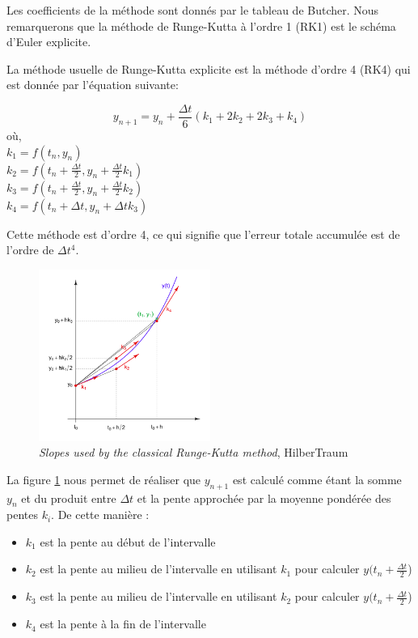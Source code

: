 Les coefficients de la méthode sont donnés par le tableau de Butcher. Nous remarquerons que la méthode de Runge-Kutta à l'ordre 1 (RK1) est le schéma d'Euler explicite.

La méthode usuelle de Runge-Kutta explicite est la méthode d'ordre 4 (RK4) qui est donnée par l'équation suivante:

\begin{equation}
    y_{n+1} = y_n + \frac{\Delta t}{6}(k_1 + 2k_2 + 2k_3 + k_4)
\end{equation}
où,\\
$k_1 = f(t_n, y_n)$\\
$k_2 = f(t_n + \frac{\Delta t}{2}, y_n + \frac{\Delta t}{2}k_1)$\\
$k_3 = f(t_n + \frac{\Delta t}{2}, y_n + \frac{\Delta t}{2}k_2)$\\
$k_4 = f(t_n + \Delta t, y_n + \Delta tk_3)$

Cette méthode est d'ordre 4, ce qui signifie que l'erreur totale accumulée est de l'ordre de $\Delta t^4$.

\begin{figure}[h]
    \centering
    \includegraphics[width=0.5\textwidth]{images/RK_pentes.png}
    \caption{\textit{Slopes used by the classical Runge-Kutta method}, HilberTraum}
\label{fig:pentes_rk}
\end{figure}

La figure \ref{fig:pentes_rk} nous permet de réaliser que $y_{n+1}$ est calculé comme étant la somme $y_n$ et du produit entre $\Delta t$ et la pente approchée par la moyenne pondérée des pentes $k_i$. De cette manière :
\begin{itemize}
    \item $k_1$ est la pente au début de l'intervalle
    \item $k_2$ est la pente au milieu de l'intervalle en utilisant $k_1$ pour calculer $y(t_n + \frac{\Delta t}{2}$)
    \item $k_3$ est la pente au milieu de l'intervalle en utilisant $k_2$ pour calculer $y(t_n + \frac{\Delta t}{2}$)
    \item $k_4$ est la pente à la fin de l'intervalle
\end{itemize}

